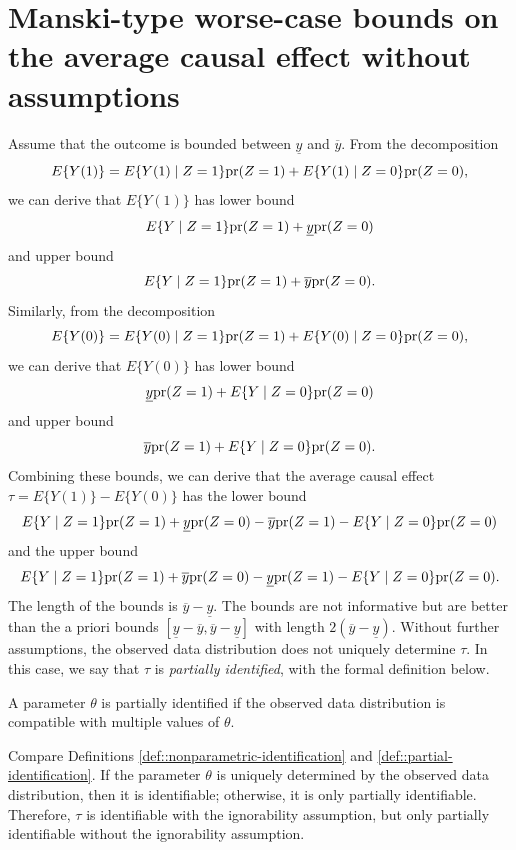\section{Manski-type worse-case bounds on the average causal effect without assumptions}\label{subsection::manski-bounds}
\label{sec::manski-bounds}



Assume that the outcome is bounded between $\underline{y}$ and $\overline{y}$.
From the decomposition
$$
E\{  Y(1) \} = E\{  Y(1) \mid Z=1\} \textup{pr}(Z=1)  +  E\{  Y(1) \mid Z=0\} \textup{pr}(Z=0)  ,
$$
we can derive that $E\{  Y(1) \}$ has lower bound
$$
E\{  Y \mid Z=1\} \textup{pr}(Z=1)  +   \underline{y} \textup{pr}(Z=0) 
$$
and upper bound
$$
E\{  Y \mid Z=1\} \textup{pr}(Z=1)  +  \overline{y} \textup{pr}(Z=0).
$$
Similarly, from the decomposition
$$
E\{  Y(0) \} = E\{  Y(0) \mid Z=1\} \textup{pr}(Z=1)  +  E\{  Y(0) \mid Z=0\} \textup{pr}(Z=0)  ,
$$
we can derive that $E\{  Y(0) \}$ has lower bound
$$
\underline{y}\textup{pr}(Z=1)  +  E\{  Y \mid Z=0\} \textup{pr}(Z=0) 
$$
and upper bound
$$
 \overline{y} \textup{pr}(Z=1)  +  E\{  Y \mid Z=0\} \textup{pr}(Z=0). 
$$
Combining these bounds, we can derive that the average causal effect $\tau = E\{  Y(1) \} - E\{  Y(0) \}$ has the lower bound
$$
E\{  Y \mid Z=1\} \textup{pr}(Z=1)  +   \underline{y} \textup{pr}(Z=0) - \overline{y} \textup{pr}(Z=1)  -  E\{  Y \mid Z=0\} \textup{pr}(Z=0) 
$$
and the upper bound
$$
 E\{  Y \mid Z=1\} \textup{pr}(Z=1)  +  \overline{y} \textup{pr}(Z=0) - \underline{y}\textup{pr}(Z=1)  -   E\{  Y \mid Z=0\} \textup{pr}(Z=0). 
$$ 
The length of the bounds is $\overline{y}-\underline{y}$. The bounds are not informative but are better than the a priori bounds $[\underline{y}-\overline{y}, \overline{y}-\underline{y}]$ with length $2(\overline{y}-\underline{y})$. Without further assumptions, the observed data distribution does not uniquely determine $\tau$. In this case, we say that $\tau$ is {\it partially identified}, with the formal definition below. 


\begin{definition}
\label{def::partial-identification}
A parameter $\theta$ is partially identified if the observed data distribution is compatible with multiple values of $\theta$. 
\end{definition}


Compare Definitions \ref{def::nonparametric-identification} and \ref{def::partial-identification}. If the parameter $\theta$ is uniquely determined by the observed data distribution, then it is identifiable; otherwise, it is only partially identifiable.  Therefore, $\tau$ is identifiable with the ignorability assumption, but only partially identifiable without the ignorability assumption. 




